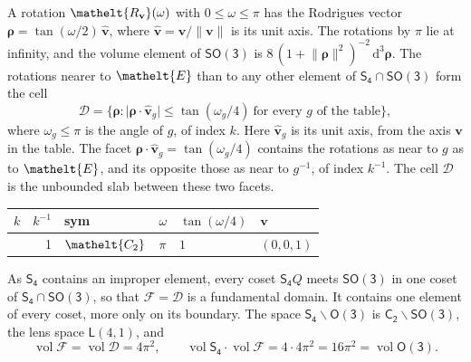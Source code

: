 \documentclass[10pt,a4paper]{article}
\numberwithin{equation}{section}
\newcommand{\eltfont}[1]{{\let\sigma\eltsigma\mathelt{#1}}}
\newcommand{\grp}[1]{\mathsf{#1}}
\newcommand{\cls}[1]{\eltfont{#1}}
\newcommand{\elt}[1]{\eltfont{#1}}
\newcommand{\dirvec}[3]{(#1, #2, #3)}
\newcommand{\unitaxis}{\hat{\mathbf{v}}}
\newcommand{\vv}{\mathbf{v}}
\newcommand{\diff}{\mathrm{d}}
\newcommand{\vol}{\operatorname{vol}}
\newcommand{\rodrigues}{\boldsymbol{\rho}}
\newcommand{\fcell}{\mathcal{D}}
\newcommand{\fdomain}{\mathcal{F}}
\newcommand{\lensspace}[2]{\mathsf{L}(#1, #2)}
\begin{document}
\leavevmode\label{n:vector.rodrigues}\label{n:vector.unitaxis}A rotation $\elt{R_{\vv}}(\omega)$ with $0 \le \omega \le \pi$ has the Rodrigues vector $\rodrigues = \tan(\omega/2)\,\unitaxis$, where $\unitaxis = \vv/\lVert\vv\rVert$ is its unit axis. The rotations by $\pi$ lie at infinity, and the volume element of \href{SO3.pdf}{$\grp{SO(3)}$} is $8\,(1 + \lVert\rodrigues\rVert^2)^{-2}\,\diff^3\rodrigues$.
\leavevmode\label{n:set.cell}The rotations nearer to $\elt{E}$ than to any other element of $\grp{S_{4}} \cap \grp{SO(3)}$ form the cell
\begin{equation}\label{e:cell}\fcell = \bigl\{\rodrigues : \lvert\rodrigues\cdot\unitaxis_g\rvert \le \tan(\omega_g/4)\ \text{for every $g$ of the table}\bigr\},\end{equation}
where $\omega_g \le \pi$ is the angle of $g$, of index $k$. Here $\unitaxis_g$ is its unit axis, from the axis $\vv$ in the table. The facet $\rodrigues\cdot\unitaxis_g = \tan(\omega_g/4)$ contains the rotations as near to $g$ as to $\elt{E}$, and its opposite those as near to $g^{-1}$, of index $k^{-1}$. The cell $\fcell$ is the unbounded slab between these two facets.
{\small\begin{longtable}{@{}rrllll@{}}\toprule
$k$ & $k^{-1}$ & sym & $\omega$ & $\tan(\omega/4)$ & $\vv$\\\midrule\endhead
\bottomrule\endfoot\endlastfoot
1 & 1 & $\cls{C_{2}}$ & $\pi$ & $1$ & $\dirvec{0}{0}{1}$\\
\bottomrule\end{longtable}}

\leavevmode\label{n:set.fundamental}As $\grp{S_{4}}$ contains an improper element, every coset $\grp{S_{4}}Q$ meets \href{SO3.pdf}{$\grp{SO(3)}$} in one coset of $\grp{S_{4}} \cap \grp{SO(3)}$, so that $\fdomain = \fcell$ is a fundamental domain. It contains one element of every coset, more only on its boundary.
\leavevmode\label{n:set.lens}The space $\grp{S_{4}}\backslash\grp{O(3)}$ is $\grp{C_{2}}\backslash\grp{SO(3)}$, the lens space $\lensspace{4}{1}$, and
\begin{equation}\label{e:volume}\vol\fdomain = \vol\fcell = 4\pi^2,\qquad \vol\grp{S_{4}}\cdot\vol\fdomain = 4\cdot 4\pi^2 = 16\pi^2 = \vol\grp{O(3)}.\end{equation}
\end{document}
